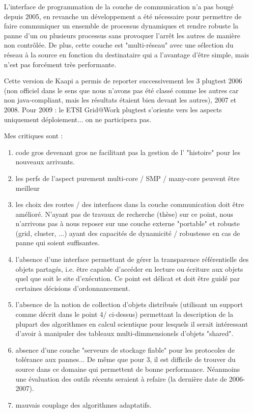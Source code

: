 \documentclass[12pt]{report}
\begin{document}
L'interface de programmation de la couche de communication n'a pas bougé depuis 2005, en revanche un développement a été nécessaire pour permettre de faire communiquer un ensemble de processus dynamiques et rendre robuste la panne d'un ou plusieurs processus sans provoquer l'arrêt les autres de manière non contrôlée. De plus, cette couche est "multi-réseau" avec une sélection du réseau à la source en fonction du destinataire qui a l'avantage d'être simple, mais n'est pas forcément très performante.

Cette version de Kaapi a permis de reporter successivement les 3 plugtest 2006 (non officiel dans le sens que nous n'avons pas été classé comme les autres car non java-compliant, mais les résultats étaient bien devant les autres), 2007 et 2008.
Pour 2009 : le ETSI Grid@Work plugtest s'oriente vers les aspects uniquement déploiement... on ne participera pas.

Mes critiques sont :
\begin{enumerate}
\item code gros devenant gros ne facilitant pas la gestion de l' "histoire" pour les nouveaux arrivants.
\item les perfs de l'aspect purement multi-core / SMP / many-core peuvent être meilleur
\item les choix des routes / des interfaces dans la couche communication doit être amélioré. N'ayant pas de travaux de recherche (thèse) sur ce point, nous n'arrivons pas à nous reposer sur une couche externe "portable" et robuste (grid, cluster, ...) ayant des capacités de dynamicité / robustesse en cas de panne qui soient suffisantes.
\item l'absence d'une interface permettant de gérer la transparence référentielle des objets partagés, i.e. être capable d'accéder en lecture ou écriture aux objets quel que soit le site d'exécution. Ce point est délicat et doit être guidé par certaines décisions d'ordonnancement.
\item l'absence de la notion de collection d'objets distribués (utilisant un support comme décrit dans le point 4/ ci-dessus) permettant la description de la plupart des  algorithmes en calcul scientique pour lesquels il serait intéressant d'avoir à manipuler des tableaux multi-dimmensionels d'objets "shared".
\item absence d'une couche "serveurs de stockage fiable" pour les protocoles de tolérance aux pannes... De même que pour 3, il est difficile de trouver du source dans ce domaine qui permettent de bonne performance. Néanmoins une évaluation des outils récents seraient à refaire (la dernière date de 2006-2007).
\item mauvais couplage des algorithmes adaptatifs.
\end{enumerate}
\end{document}
